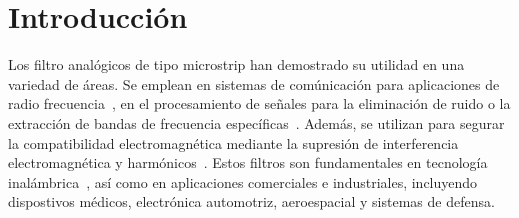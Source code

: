 \section{Introducción}
Los filtro analógicos de tipo microstrip han demostrado su utilidad en una variedad de áreas. Se emplean en sistemas de comúnicación para aplicaciones de radio frecuencia~\cite{zhang2023multi}, en el procesamiento de señales para la eliminación de ruido o la extracción de bandas de frecuencia específicas~\cite{islam2021spectrum}. Además, se utilizan para segurar la compatibilidad electromagnética mediante la supresión de interferencia electromagnética y harmónicos~\cite{kumar2023electromagnetic}. Estos filtros son fundamentales en tecnología inalámbrica~\cite{ibrahim2020compact}, así como en aplicaciones comerciales e industriales, incluyendo dispostivos médicos, electrónica automotriz, aeroespacial y sistemas de defensa.

